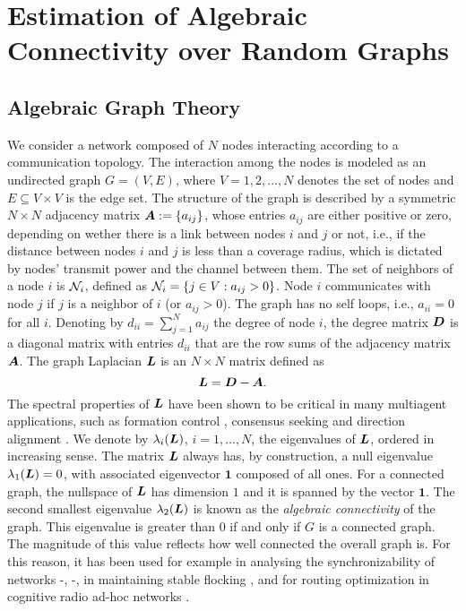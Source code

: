 \documentclass[10pt,twocolumn]{IEEEtran}
\def\bA{\mbox{\boldmath $A$}}
\def\bD{\mbox{\boldmath $D$}}
\def\bL{\mbox{\boldmath $L$}}
\begin{document}
\section{Estimation of Algebraic Connectivity over Random Graphs}

\subsection{Algebraic Graph Theory}

We consider a network composed of $N$ nodes interacting according to a communication topology. The interaction among the nodes is modeled as an undirected graph $G=(V,E)$, where  $V={1,2,...,N}$ denotes the set of nodes and $E\subseteq V\times V$ is the edge set. The structure of the graph is described by a symmetric $N\times N$ adjacency matrix $\bA:=\{a_{ij}\}$, whose entries $a_{ij}$ are either positive or zero, depending on wether there is a link between nodes $i$ and $j$ or not, i.e., if the distance between nodes $i$ and $j$ is less than a coverage radius, which is dictated by nodes' transmit power and the channel between them. The set of neighbors of a node $i$ is ${\cal N}_i$, defined as ${\cal N}_i=\{j\in V:a_{ij}>0\}$. Node $i$ communicates with node $j$ if $j$ is a neighbor of $i$ (or $a_{ij}>0$). The graph has no self loops, i.e., $a_{ii}=0$ for all $i$. Denoting by $d_{ii}=\sum_{j=1}^{N}a_{ij}$ the degree of node $i$,  the degree matrix $\bD$ is a diagonal matrix with entries $d_{ii}$ that are the row sums of the adjacency matrix $\bA$. The graph Laplacian $\bL$ is an $N\times N$ matrix defined as
\begin{equation}
\bL=\bD-\bA.
\end{equation}
The spectral properties of $\bL$ have been shown to be critical in many multiagent applications, such as formation control \cite{Fax_murray}, consensus seeking \cite{Barb-Scut} and direction alignment \cite{Jad-Lin-Morse}. We denote by $\lambda_i(\bL)$, $i=1, \ldots, N$, the eigenvalues of $\bL$, ordered in increasing sense. The matrix $\bL$ always has, by construction, a null eigenvalue $\lambda_1(\bL)=0$, with associated eigenvector $\mathbf{1}$ composed of all ones. For a connected graph, the nullspace of $\bL$ has dimension $1$ and it is spanned by the vector $\mathbf{1}$. The second smallest eigenvalue $\lambda_2(\bL)$ is known as the {\it algebraic connectivity} of the graph. This eigenvalue is greater than 0 if and only if $G$ is a connected graph. The magnitude of this value reflects how well connected the overall graph is. For this reason, it has been used for example in analysing the synchronizability of networks \cite{Olfati1}-\cite{Scutari-Barbarossa-Pescosolido}, \cite{Fax_murray}-\cite{Barb-Scut}, in maintaining stable flocking   \cite{Jad-Lin-Morse}, and for routing optimization in cognitive radio ad-hoc networks \cite{Abb-Cuo}.
\end{document}
